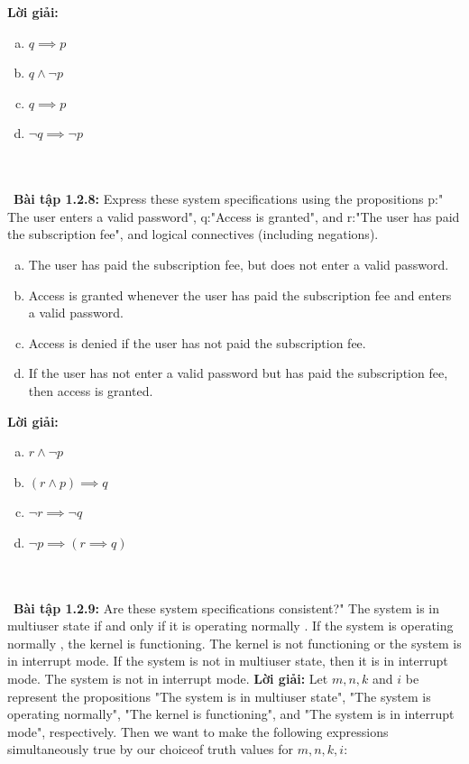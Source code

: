 \documentclass[a4paper]{article}
\begin{document}
\textbf{Lời giải: } \begin{enumerate}[a)]
\item $q \implies  p$
\item $q \land \lnot  p$
\item $q \implies  p$
\item $\lnot q \implies \lnot  p$
\end{enumerate}
\\\ \\\
\textbf{Bài tập 1.2.8:}  Express these system specifications using the propositions p:" The user enters a valid password", q:"Access is granted", and r:"The user has paid the subscription fee", and logical connectives (including negations).
\begin{enumerate}[a)]
\item The user has paid the subscription fee, but does not enter a valid password.
\item Access is granted whenever the user has paid  the subscription fee and enters a valid password.
\item Access is denied if the user has not paid the subscription fee.
\item If the user has not enter a valid password but has paid the subscription fee, then access is granted.
\end{enumerate}
\textbf{Lời giải: } \begin{enumerate}[a)]
\item $r \land \lnot p$
\item $(r \land p) \implies q$
\item $\lnot r \implies \lnot q$
\item $\lnot p \implies (r \implies q)$
\end{enumerate} \\\ \\\
\textbf{Bài tập 1.2.9:}  Are these system specifications consistent?" The system is in multiuser state if and only if it is operating normally . If the system is operating normally , the kernel is functioning. The kernel is not functioning  or the system is in interrupt mode. If the system is not in multiuser state, then it is in interrupt mode. The system is not in interrupt mode.
\textbf{Lời giải: } Let $m,n,k$ and $i$ be represent the propositions "The system is in multiuser state", "The system is operating normally", "The kernel is functioning", and "The system is in interrupt mode", respectively. Then we want to make the following expressions simultaneously true by our choiceof truth values for $m,n,k,i$:
\end{document}

